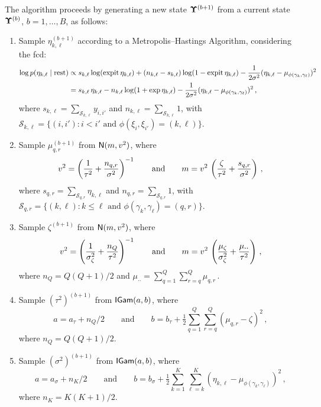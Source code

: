 \documentclass[letterpaper,12pt,openany]{article}
\def\exp#1{{\rm exp}{#1}}
\def\frac#1#2{{{#1}\over{#2}}}
\DeclareMathOperator*{\expit}{expit}
\def\Nor{\small{\mathsf{N}}}
\def\IGamd{\small{\mathsf{IGam}}}
\def\rest{\text{rest}}
\def\ga{\gamma}\def\gav{\boldsymbol{\gamma}}
\def\sig{\sigma}\def\sigv{\boldsymbol{\sigma}}
\begin{document}
The algorithm proceeds by generating a new state $\mathbf{\Upsilon}^{(b+1)}$ from a current state $\mathbf{\Upsilon}^{(b)}$, $b=1,\ldots,B$, as follows:
\begin{enumerate}
	
	\item Sample $\eta_{k,\ell}^{(b+1)}$ according to a Metropolis--Hastings Algorithm, considering the fcd:
	\begin{align*}
	\log p(\eta_{k,\ell}\mid\rest) 
	&\propto 
	s_{k,\ell}\log(\expit\eta_{k,\ell}) + (n_{k,\ell}-s_{k,\ell})\log(1-\expit\eta_{k,\ell}) - \frac{1}{2\sigma^2}(\eta_{k,\ell} - \mu_{\phi(\ga_k,\ga_\ell)})^2 \\
	&= s_{k,\ell}\,\eta_{k,\ell} - n_{k,\ell} \log(1 + \exp\,\eta_{k,\ell}) - \frac{1}{2\sigma^2}(\eta_{k,\ell} - \mu_{\phi(\ga_k,\ga_\ell)})^2\,,
	\end{align*}
	where $s_{k,\ell} = \sum_{\mathcal{S}_{k,\ell}} y_{i,i'}$ and $n_{k,\ell} = \sum_{\mathcal{S}_{k,\ell}} 1$, with $\mathcal{S}_{k,\ell} = \{(i,i'):i<i'\text{ and }\phi(\xi_i,\xi_{i'})=(k,\ell)\}$. 
	
	\item Sample $\mu_{q,r}^{(b+1)}$ from $\Nor(m,v^2)$, where
	$$v^2 = \left(\frac{1}{\tau^2} + \frac{n_{q,r}}{\sigma^2}\right)^{-1} \qquad\text{and}\qquad m =	v^2\,\left( \frac{\zeta}{\tau^2} + \frac{s_{q,r}}{\sigma^2} \right)\,,$$
	where $s_{q,r} = \sum_{\mathcal{S}_{q,r}} \eta_{k,\ell}$ and $n_{q,r} = \sum_{\mathcal{S}_{q,r}} 1$, with $\mathcal{S}_{q,r} = \{(k,\ell):k\leq \ell\text{ and }\phi(\ga_k,\ga_\ell)=(q,r)\}$. 
	
	\item Sample $\zeta^{(b+1)}$ from $\Nor(m,v^2)$, where
	$$
	v^2 = \left(\frac{1}{\sig^2_\zeta} + \frac{n_Q}{\tau^2}\right)^{-1} \qquad\text{and}\qquad m =	v^2\,\left( \frac{\mu_\zeta}{\sig^2_\zeta} + \frac{\mu_{\boldsymbol{\cdot}\boldsymbol{\cdot}}}{\tau^2} \right)\,,
	$$
	where $n_Q = Q(Q+1)/2$ and  $\mu_{\boldsymbol{\cdot}\boldsymbol{\cdot}} = \sum_{q=1}^Q\sum_{r=q}^Q \mu_{q,r}$\,.
	
	\item Sample $(\tau^2)^{(b+1)}$ from $\IGamd(a,b)$, where
	$$
	a = a_\tau + n_Q/2  \qquad\text{and}\qquad  b = b_\tau + \tfrac12\sum_{q=1}^Q\sum_{r=q}^Q  (\mu_{q,r} - \zeta)^2\,,
	$$ 
	where $n_Q = Q(Q+1)/2$.
	
	\item Sample $(\sig^2)^{(b+1)}$ from $\IGamd(a,b)$, where
	$$
	a = a_\sig + n_K/2  \qquad\text{and}\qquad  b = b_\sig + \tfrac12\sum_{k=1}^K\sum_{\ell=k}^K (\eta_{k,\ell} - \mu_{\phi(\ga_k,\ga_\ell)})^2\,,
	$$ 
	where $n_K = K(K+1)/2$.	
	

\end{enumerate}
\end{document}
